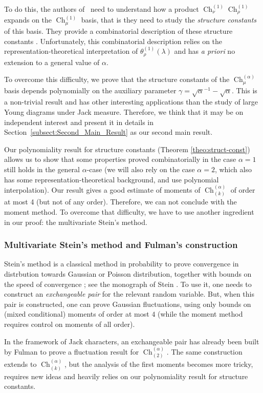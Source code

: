 \documentclass[11pt]{amsart}
\theoremstyle{plain}
\theoremstyle{remark}
\DeclareMathOperator{\Ch}{Ch}
\begin{document}
To do this, the authors of~\cite{IvanovOlshanski2002} need to understand how a product
$\Ch_{\nu}^{(1)} \Ch_{\rho}^{(1)}$ expands on the $\Ch_{\mu}^{(1)}$ basis,
that is they need to study the {\em structure constants} of this basis.
They provide a combinatorial description of these structure constants 
\cite[Proposition 4.5]{IvanovOlshanski2002}.
Unfortunately, this combinatorial description relies on the representation-theoretical
interpretation of $\theta_{\rho}^{(1)}(\lambda)$ and has {\em a priori} no
extension to a general value of $\alpha$.

To overcome this difficulty, we prove that the structure constants
of the $\Ch_{\mu}^{(\alpha)}$ basis depends polynomially on
the auxiliary parameter $\gamma={\sqrt{\alpha}}^{-1}-\sqrt{\alpha}$.
This is a non-trivial result and has other interesting applications
than the study of large Young diagrams under Jack measure.
Therefore, we think that it may be on independent interest and
present it in details in Section~\ref{subsect:Second_Main_Result}
as our second main result.

Our polynomiality result for structure constants
(Theorem \ref{theo:struct-const}) allows us to show that
some properties proved combinatorially in the case $\alpha=1$ still holds
in the general $\alpha$-case
(we will also rely on the case $\alpha=2$, 
which also has some representation-theoretical background,
and use polynomial interpolation).
Our result gives a good estimate of
moments of $\Ch_{(k)}^{(\alpha)}$ of order at most 4 (but not of any order).
Therefore, we can not conclude with the moment method.
To overcome that difficulty, we have to use another ingredient in our proof:
the multivariate Stein's method.

\subsubsection{Multivariate Stein's method and Fulman's construction}
Stein's method is a classical method in probability
to prove convergence in distrbution towards Gaussian or Poisson distribution,
together with bounds on the speed of convergence ;
see the monograph of Stein \cite{Stein}.
To use it, one needs to construct an {\em exchangeable pair} for the relevant random variable.
But, when this pair is constructed, one can prove Gaussian fluctuations,
using only bounds on (mixed conditional) moments of order at most $4$
(while the moment method requires control on moments of all order).

In the framework of Jack characters, an exchangeable pair
has already been built by Fulman to prove a fluctuation result for $\Ch^{(\alpha)}_{(2)}$.
The same construction extends to $\Ch^{(\alpha)}_{(k)}$,
but the analysis of the first moments becomes more tricky, requires new ideas
and heavily relies on our polynomiality result for structure constants.
\end{document}
